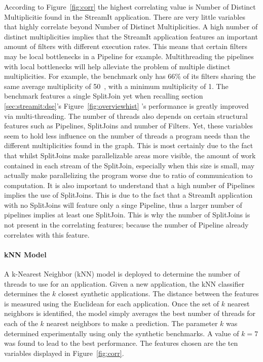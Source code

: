 According to Figure~\ref{fig:corr} the highest correlating value is Number of Distinct Multiplicitie found in the StreamIt application.
There are very little variables that highly correlate beyond Number of Distinct Multiplicities.
A high number of distinct multiplicities implies that the StreamIt application features an important amount of filters with different execution rates.
This means that certain filters may be local bottlenecks in a Pipeline for example.
Multithreading the pipelines with local bottlenecks will help alleviate the problem of multiple distinct multiplicities.
For example, the benchmark  only has 66\% of its filters sharing the same average multiplicity of 50~\cite{thiesStreamit2010}, with a minimum multiplicity of 1. 
The benchmark features a single SplitJoin yet when recalling section \ref{sec:streamit:dse}'s Figure~\ref{fig:overviewhist} 's performance is greatly improved via multi-threading.
The number of threads also depends on certain structural features such as Pipelines, SplitJoins and number of Filters.
Yet, these variables seem to hold less influence on the number of threads a program needs than the different multiplicities found in the graph.
This is most certainly due to the fact that whilst SplitJoins make parallelizable areas more visible, the amount of work contained in each stream of the SplitJoin, especially when this size is small, may actually make parallelizing the program worse due to ratio of communication to computation.
It is also important to understand that a high number of Pipelines implies the use of SplitJoins.
This is due to the fact that a StreamIt application with no SplitJoins will feature only a singe Pipeline, thus a larger number of pipelines implies at least one SplitJoin.
This is why the number of SplitJoins is not present in the correlating features; because the number of Pipeline already correlates with this feature.\\

\paragraph{kNN Model}
A k-Nearest Neighbor (kNN) model is deployed to determine the number of threads to use for an application.
Given a new application, the kNN classifier determines the $k$ closest synthetic applications.
The distance between the features is measured using the Euclidean for each application.
Once the set of $k$ nearest neighbors is identified, the model simply averages the best number of threads for each of the $k$ nearest neighbors to make a prediction.
The parameter $k$ was determined experimentally using only the synthetic benchmarks.
A value of $k=7$ was found to lead to the best performance.
The features chosen are the ten variables displayed in Figure~\ref{fig:corr}.

